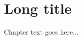 \documentclass[../main.tex]{subfiles}
\begin{document}
\chapter[Short title]{Long title}
\label{cha:label1}

Chapter text goes here...
\end{document}
